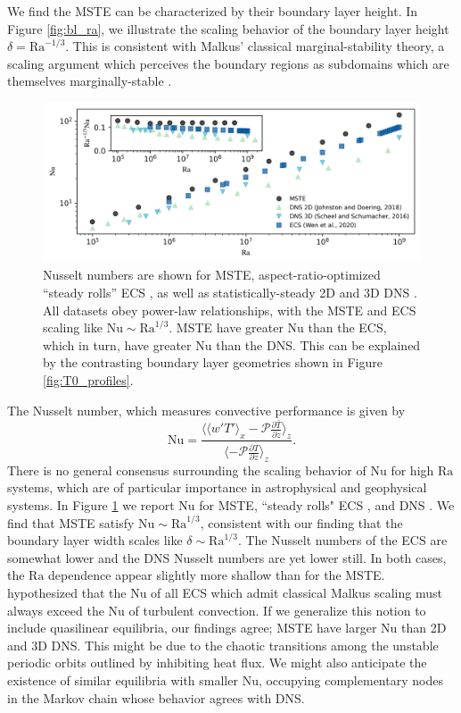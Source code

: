 \documentclass[reprint,amsmath,amssymb,aps]{revtex4-1}
\newcommand\Ra{\mathrm{Ra}}
\newcommand\Nu{\mathrm{Nu}}
\begin{document}
We find the MSTE can be characterized by their boundary layer height.
In Figure \ref{fig:bl_ra}, we illustrate the scaling behavior of the boundary layer height $\delta = \Ra^{-1/3}$. 
This is consistent with Malkus' classical marginal-stability theory, a scaling argument which perceives the boundary regions as subdomains which are themselves marginally-stable \cite{Malkus_1954}.

\begin{figure}
    \centering
    \includegraphics[width=7.1in]{nu_ra.PNG}
    \caption{Nusselt numbers are shown for MSTE, aspect-ratio-optimized ``steady rolls'' ECS \cite{Wen}, as well as statistically-steady 2D and 3D DNS \cite{Johnston, Scheel_2016}.
    All datasets obey power-law relationships, with the MSTE and ECS scaling like $\Nu \sim\Ra^{1/3}$. 
    MSTE have greater $\Nu$ than the ECS, which in turn, have greater $\Nu$ than the DNS. 
    This can be explained by the contrasting boundary layer geometries shown in Figure \ref{fig:T0_profiles}.}%
    \label{fig:nu_vs_ra}%
\end{figure}

The Nusselt number, which measures convective performance is given by
\begin{equation}
    \Nu = \frac{\langle \langle w'T' \rangle_x - \mathcal{P}\frac{\partial \bar{T}}{\partial z} \rangle_z}{\langle- \mathcal{P}\frac{\partial \bar{T}}{\partial z} \rangle_z}.
\end{equation}
There is no general consensus surrounding the scaling behavior of $\Nu$ for high $\Ra$ systems, which are of particular importance in astrophysical and geophysical systems. In Figure \ref{fig:nu_vs_ra} we report $\Nu$ for MSTE, ``steady rolls" ECS \cite{Wen}, and DNS \cite{Scheel_2016, Johnston}. 
We find that MSTE satisfy $\Nu \sim\Ra^{1/3}$, consistent with our finding that the boundary layer width scales like $\delta \sim \Ra^{1/3}$.
The Nusselt numbers of the ECS are somewhat lower and the DNS Nusselt numbers are yet lower still.
In both cases, the $\Ra$ dependence appear slightly more shallow than for the MSTE.
\cite{Wen} hypothesized that the $\Nu$ of all ECS which admit classical Malkus scaling must always exceed the $\Nu$ of turbulent convection.
If we generalize this notion to include quasilinear equilibria, our findings agree; MSTE have larger $\Nu$ than 2D and 3D DNS.
This might be due to the chaotic transitions among the unstable periodic orbits outlined by \cite{Yalniz, Cvitanovic} inhibiting heat flux. 
We might also anticipate the existence of similar equilibria with smaller $\Nu$, occupying complementary nodes in the Markov chain whose behavior agrees with DNS. 
\end{document}
